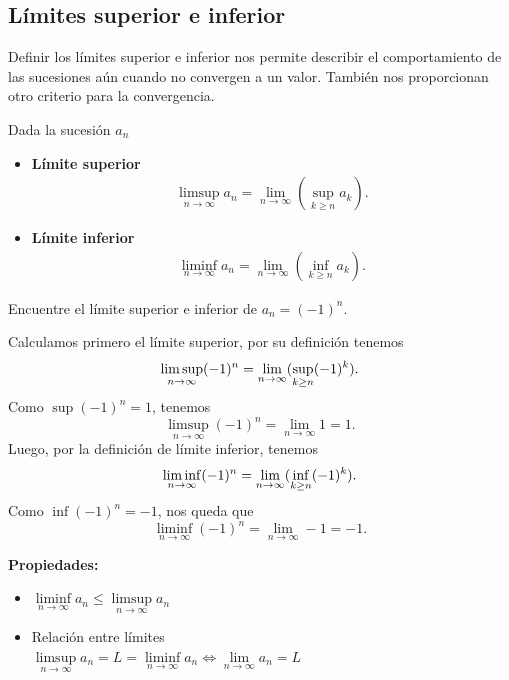 \documentclass[12pt]{book}
\begin{document}
\subsection{Límites superior e inferior}

Definir los límites superior e inferior nos permite describir el comportamiento de las sucesiones aún cuando no convergen a un valor. También nos proporcionan otro criterio para la convergencia.
\noindent
\begin{definitionenv}
    Dada la sucesión $a_n$
    \begin{itemize}
        \item \textbf{Límite superior}
            \begin{align*}
                \limsup\limits_{n\to \infty}a_n=\lim\limits_{n\to \infty}   (\sup\limits_{k\ge n}a_k).
            \end{align*}
        \item \textbf{Límite inferior}
            \begin{align*}
                \liminf\limits_{n\to \infty}a_n=\lim\limits_{n\to \infty}   (\inf\limits_{k\ge n}a_k).
            \end{align*}
    \end{itemize}
\end{definitionenv}

\begin{exampleenv}
Encuentre el límite superior e inferior de $a_n=(-1)^n$.

Calculamos primero el límite superior, por su definición tenemos
\[
    \limsup\limits_{n\to\infty}(-1)^n=\lim\limits_{n\to\infty}(\sup_{k\ge n}(-1)^k).\\
\]
Como $\sup(-1)^n=1$, tenemos
\[
    \limsup\limits_{n\to\infty}(-1)^n=\lim\limits_{n\to\infty}1=1.
\]
Luego, por la definición de límite inferior, tenemos
\[
    \liminf\limits_{n\to\infty}(-1)^n=\lim\limits_{n\to\infty}(\inf_{k\ge n}(-1)^k).\\
\]
Como $\inf(-1)^n=-1$, nos queda que
\[
    \liminf\limits_{n\to\infty}(-1)^n=\lim\limits_{n\to\infty}-1=-1.
\]
\end{exampleenv}

\textbf{Propiedades:}
\begin{itemize}
    \item $\liminf\limits_{n\to\infty}a_n\leq \limsup\limits_{n\to\infty}a_n$
    \item Relación entre límites\\
    $\limsup\limits_{n\to\infty}a_n=L=\liminf\limits_{n\to\infty}a_n\iff\lim\limits_{n\to\infty}a_n=L$
\end{itemize}
\end{document}
